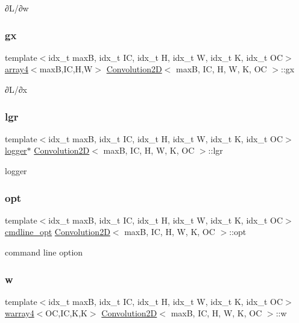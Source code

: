 ∂\+L/∂w \mbox{\label{structConvolution2D_a1bc2147fc750b2587a82d865eef24d2c}} 
\subsubsection{\texorpdfstring{gx}{gx}}
{\footnotesize\ttfamily template$<$idx\+\_\+t maxB, idx\+\_\+t IC, idx\+\_\+t H, idx\+\_\+t W, idx\+\_\+t K, idx\+\_\+t OC$>$ \\
\hyperlink{structarray4}{array4}$<$maxB,IC,H,W$>$ \hyperlink{structConvolution2D}{Convolution2D}$<$ maxB, IC, H, W, K, OC $>$\+::gx}

∂\+L/∂x \mbox{\label{structConvolution2D_a1c0363cbb527e0dcdb032a2b6b5ea9e6}} 
\subsubsection{\texorpdfstring{lgr}{lgr}}
{\footnotesize\ttfamily template$<$idx\+\_\+t maxB, idx\+\_\+t IC, idx\+\_\+t H, idx\+\_\+t W, idx\+\_\+t K, idx\+\_\+t OC$>$ \\
\hyperlink{structlogger}{logger}$\ast$ \hyperlink{structConvolution2D}{Convolution2D}$<$ maxB, IC, H, W, K, OC $>$\+::lgr}

logger \mbox{\label{structConvolution2D_ad873766a934a3589b2feec7933dc11f2}} 
\subsubsection{\texorpdfstring{opt}{opt}}
{\footnotesize\ttfamily template$<$idx\+\_\+t maxB, idx\+\_\+t IC, idx\+\_\+t H, idx\+\_\+t W, idx\+\_\+t K, idx\+\_\+t OC$>$ \\
\hyperlink{structcmdline__opt}{cmdline\+\_\+opt} \hyperlink{structConvolution2D}{Convolution2D}$<$ maxB, IC, H, W, K, OC $>$\+::opt}

command line option \mbox{\label{structConvolution2D_a20027e8ac911e6ec9db15a7ecaf4a16a}} 
\subsubsection{\texorpdfstring{w}{w}}
{\footnotesize\ttfamily template$<$idx\+\_\+t maxB, idx\+\_\+t IC, idx\+\_\+t H, idx\+\_\+t W, idx\+\_\+t K, idx\+\_\+t OC$>$ \\
\hyperlink{structwarray4}{warray4}$<$OC,IC,K,K$>$ \hyperlink{structConvolution2D}{Convolution2D}$<$ maxB, IC, H, W, K, OC $>$\+::w}


